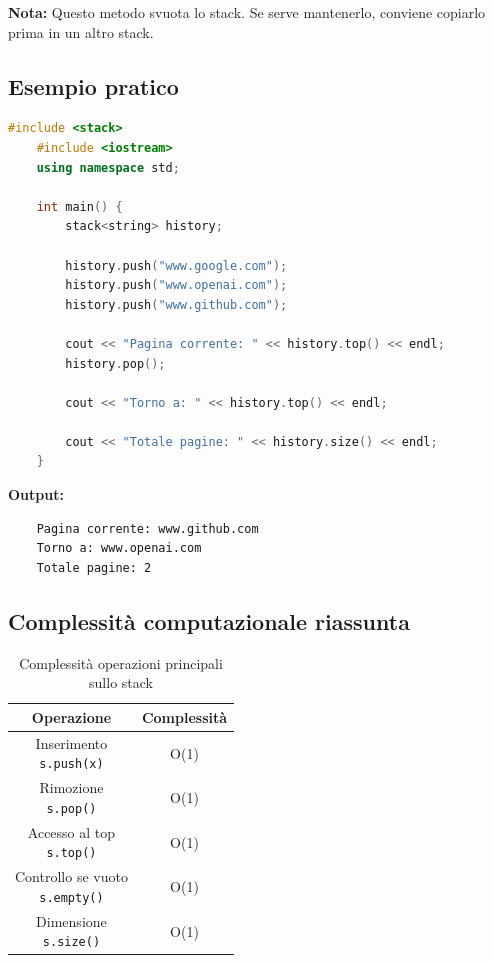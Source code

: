 \textbf{Nota:}  
Questo metodo svuota lo stack. Se serve mantenerlo, conviene copiarlo prima in un altro stack.

\subsection{Esempio pratico}

\begin{lstlisting}[language=C++]
	#include <stack>
	#include <iostream>
	using namespace std;
	
	int main() {
		stack<string> history;
		
		history.push("www.google.com");
		history.push("www.openai.com");
		history.push("www.github.com");
		
		cout << "Pagina corrente: " << history.top() << endl;
		history.pop();
		
		cout << "Torno a: " << history.top() << endl;
		
		cout << "Totale pagine: " << history.size() << endl;
	}
\end{lstlisting}

\textbf{Output:}
\begin{verbatim}
	Pagina corrente: www.github.com
	Torno a: www.openai.com
	Totale pagine: 2
\end{verbatim}

\subsection{Complessità computazionale riassunta}

\begin{table}[h!]
	\centering
	\renewcommand{\arraystretch}{1.5}
	\setlength{\tabcolsep}{12pt}
	\begin{tabular}{|c|c|}
		\hline
		\textbf{Operazione} & \textbf{Complessità} \\
		\hline
		\makecell{Inserimento \\ \texttt{s.push(x)}} & O(1) \\
		\hline
		\makecell{Rimozione \\ \texttt{s.pop()}} & O(1) \\
		\hline
		\makecell{Accesso al top \\ \texttt{s.top()}} & O(1) \\
		\hline
		\makecell{Controllo se vuoto \\ \texttt{s.empty()}} & O(1) \\
		\hline
		\makecell{Dimensione \\ \texttt{s.size()}} & O(1) \\
		\hline
	\end{tabular}
	\caption{Complessità operazioni principali sullo stack}
	\label{tab:strutture-dati:stack:complessita}
\end{table}






